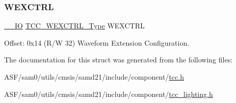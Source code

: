 \subsubsection{\texorpdfstring{WEXCTRL}{WEXCTRL}}
{\footnotesize\ttfamily \mbox{\hyperlink{core__cm0plus_8h_aec43007d9998a0a0e01faede4133d6be}{\+\_\+\+\_\+\+IO}} \mbox{\hyperlink{union_t_c_c___w_e_x_c_t_r_l___type}{T\+C\+C\+\_\+\+W\+E\+X\+C\+T\+R\+L\+\_\+\+Type}} W\+E\+X\+C\+T\+RL}



Offset\+: 0x14 (R/W 32) Waveform Extension Configuration. 



The documentation for this struct was generated from the following files\+:\begin{DoxyCompactItemize}
\item 
A\+S\+F/sam0/utils/cmsis/samd21/include/component/\mbox{\hyperlink{tcc_8h}{tcc.\+h}}\item 
A\+S\+F/sam0/utils/cmsis/samd21/include/component/\mbox{\hyperlink{tcc__lighting_8h}{tcc\+\_\+lighting.\+h}}\end{DoxyCompactItemize}

